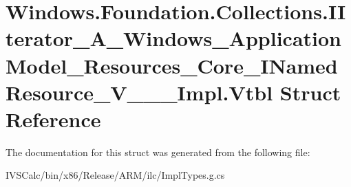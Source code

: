 \hypertarget{struct_windows_1_1_foundation_1_1_collections_1_1_i_iterator___a___windows___application_model__4ebf9a37678c51cb3d4a9da2af78499a}{}\section{Windows.\+Foundation.\+Collections.\+I\+Iterator\+\_\+\+A\+\_\+\+Windows\+\_\+\+Application\+Model\+\_\+\+Resources\+\_\+\+Core\+\_\+\+I\+Named\+Resource\+\_\+\+V\+\_\+\+\_\+\+\_\+\+Impl.\+Vtbl Struct Reference}
\label{struct_windows_1_1_foundation_1_1_collections_1_1_i_iterator___a___windows___application_model__4ebf9a37678c51cb3d4a9da2af78499a}


The documentation for this struct was generated from the following file\+:\begin{DoxyCompactItemize}
\item 
I\+V\+S\+Calc/bin/x86/\+Release/\+A\+R\+M/ilc/Impl\+Types.\+g.\+cs\end{DoxyCompactItemize}
